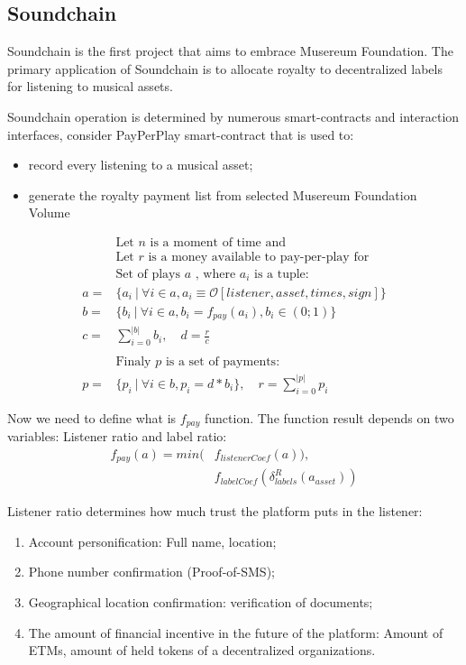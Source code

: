 \documentclass[12pt]{report}
\begin{document}
\subsection{Soundchain}
\label{tech-apps-soundchain}
\begin{multicols}{2}
Soundchain is the first project that aims to embrace Musereum Foundation. The primary application of Soundchain is to allocate royalty to decentralized labels for listening to musical assets.

Soundchain operation is determined by numerous smart-contracts and interaction interfaces, 
consider PayPerPlay smart-contract that is used to:
\begin{itemize}
	\item record every listening to a musical asset;
	\item generate the royalty payment list from selected Musereum Foundation Volume
\end{itemize}
\end{multicols}
\begin{align}
& \text {Let } n \text{ is a moment of time and} \nonumber\\
& \text{Let } r \text{ is a money available to pay-per-play for} \nonumber\\
& \text{Set of plays } a \text{ , where } a_i \text{ is a tuple:}  \nonumber\\
a = &\{a_i \ | \ \forall i \in a, a_i \equiv \mathcal{O}[listener, asset, times, sign] \} \\
b = &\{b_i \ | \ \forall i \in a, b_i = f_{pay}(a_i), b_i \in (0; 1) \} \\ 
c = &\sum\limits^{|b|}_{i=0} b_i, \quad d = \frac{r}{c} \\
& \nonumber\\
& \text{Finaly } p \text{ is a set of payments: } \nonumber\\
p = &\{ p_i \ | \ \forall i \in b, p_i = d * b_i \}, \quad r = \sum\limits^{|p|}_{i=0} p_i
\end{align}

Now we need to define what is $f_{pay}$ function. The function result depends on two variables: Listener ratio and label ratio:
\begin{align}
f_{pay}(a) = min(&f_{listenerCoef}(a)),\\
						 &f_{labelCoef}(\delta^{R}_{labels}(a_{asset}))
\end{align}

Listener ratio determines how much trust the platform puts in the listener: 
\begin{enumerate}
	\item Account personification: Full name, location;
	\item Phone number confirmation (Proof-of-SMS);
	\item Geographical location confirmation: verification of documents;
	\item The amount of financial incentive in the future of the platform: Amount of ETMs, amount of held tokens of a decentralized organizations.
\end{enumerate}
\end{document}
